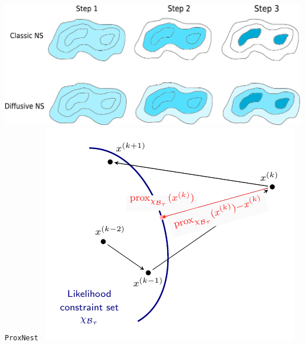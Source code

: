 \documentclass[aspectratio=169]{beamer}
\begin{document}
\begin{frame}
\begin{columns}[t]
        \includegraphics[width=\textwidth]{figures/dnest}
        \texttt{ProxNest}~
        \includegraphics[width=\textwidth]{figures/proxnest_diagram}
        \vfill
    \end{columns}
\end{frame}
\end{document}
